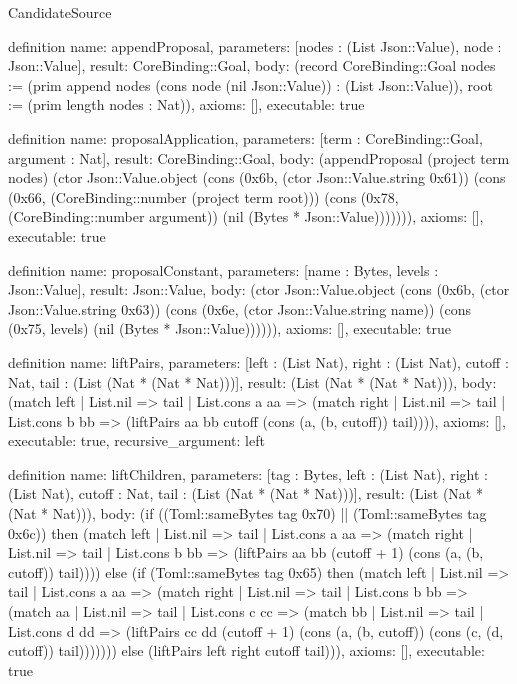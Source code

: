 \begin{lexlean}{CandidateSource}
\begin{semanticmodule}
definition{
 name: appendProposal,
 parameters: [nodes : (List Json::Value), node : Json::Value],
 result: CoreBinding::Goal,
 body: (record CoreBinding::Goal {nodes := (prim append nodes (cons node (nil Json::Value)) : (List Json::Value)), root := (prim length nodes : Nat)}),
 axioms: [],
 executable: true
}

definition{
 name: proposalApplication,
 parameters: [term : CoreBinding::Goal, argument : Nat],
 result: CoreBinding::Goal,
 body: (appendProposal (project term nodes) (ctor Json::Value.object (cons (0x6b, (ctor Json::Value.string 0x61)) (cons (0x66, (CoreBinding::number (project term root))) (cons (0x78, (CoreBinding::number argument)) (nil (Bytes * Json::Value))))))),
 axioms: [],
 executable: true
}

definition{
 name: proposalConstant,
 parameters: [name : Bytes, levels : Json::Value],
 result: Json::Value,
 body: (ctor Json::Value.object (cons (0x6b, (ctor Json::Value.string 0x63)) (cons (0x6e, (ctor Json::Value.string name)) (cons (0x75, levels) (nil (Bytes * Json::Value)))))),
 axioms: [],
 executable: true
}

definition{
 name: liftPairs,
 parameters: [left : (List Nat), right : (List Nat), cutoff : Nat, tail : (List (Nat * (Nat * Nat)))],
 result: (List (Nat * (Nat * Nat))),
 body: (match left | List.nil => tail | List.cons a aa => (match right | List.nil => tail | List.cons b bb => (liftPairs aa bb cutoff (cons (a, (b, cutoff)) tail)))),
 axioms: [],
 executable: true,
 recursive_argument: left
}

definition{
 name: liftChildren,
 parameters: [tag : Bytes, left : (List Nat), right : (List Nat), cutoff : Nat, tail : (List (Nat * (Nat * Nat)))],
 result: (List (Nat * (Nat * Nat))),
 body: (if ((Toml::sameBytes tag 0x70) || (Toml::sameBytes tag 0x6c)) then (match left | List.nil => tail | List.cons a aa => (match right | List.nil => tail | List.cons b bb => (liftPairs aa bb (cutoff + 1) (cons (a, (b, cutoff)) tail)))) else (if (Toml::sameBytes tag 0x65) then (match left | List.nil => tail | List.cons a aa => (match right | List.nil => tail | List.cons b bb => (match aa | List.nil => tail | List.cons c cc => (match bb | List.nil => tail | List.cons d dd => (liftPairs cc dd (cutoff + 1) (cons (a, (b, cutoff)) (cons (c, (d, cutoff)) tail))))))) else (liftPairs left right cutoff tail))),
 axioms: [],
 executable: true
}


\end{semanticmodule}
\end{lexlean}
